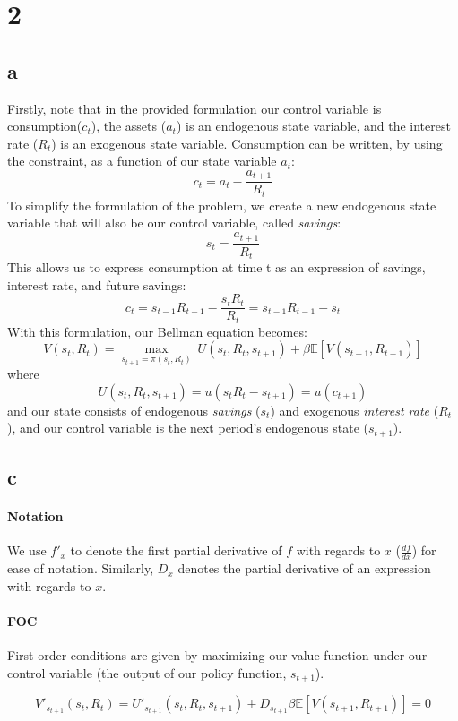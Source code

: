 \documentclass[a4paper,12pt]{article}
\begin{document}
\section*{2}
\subsection*{a}
Firstly, note that in the provided formulation our control variable is consumption($c_t$), the assets ($a_t$) is an endogenous state variable, and the interest rate ($R_t$) is an exogenous state variable. Consumption can be written, by using the constraint, as a function of our state variable $a_t$:
%
$$
c_t = a_t - \frac{a_{t+1}}{R_t}
$$
%
To simplify the formulation of the problem, we create a new endogenous state variable that will also be our control variable, called \textit{savings}:
%
$$
s_{t} = \frac{a_{t+1}}{R_{t}}
$$
%
This allows us to express consumption at time t as an expression of savings, interest rate, and future savings:
%
$$
c_t = s_{t-1}R_{t-1} - \frac{s_{t}R_{t}}{R_{t}} = s_{t-1}R_{t-1} - s_{t}
$$
%
With this formulation, our Bellman equation becomes:
%
$$
V(s_t, R_t) = \max_{s_{t+1} = \pi (s_t, R_t)} \ U(s_t, R_t, s_{t+1}) + \beta \mathbb{E}[ V(s_{t+1}, R_{t+1})]
$$
%
where
%
$$
U(s_t, R_t, s_{t+1}) = u(s_tR_t - s_{t+1}) = u(c_{t+1})
$$
%
and our state consists of endogenous \textit{savings} ($s_t$) and exogenous \textit{interest rate} ($R_t$), and our control variable is the next period's endogenous state ($s_{t+1}$).

\subsection*{c}
\paragraph{Notation} We use $f'_{x}$ to denote the first partial derivative of $f$ with regards to $x$ ($\frac{df}{dx}$) for ease of notation. Similarly, $D_x$ denotes the partial derivative of an expression with regards to $x$.

\paragraph{FOC} First-order conditions are given by maximizing our value function under our control variable (the output of our policy function, $s_{t+1}$).

$$
V'_{s_{t+1}}(s_{t}, R_{t}) = U'_{s_{t+1}}(s_t, R_t, s_{t+1}) + D_{s_{t+1}} \beta \mathbb{E} [ V(s_{t+1}, R_{t+1})] = 0
$$
\end{document}

